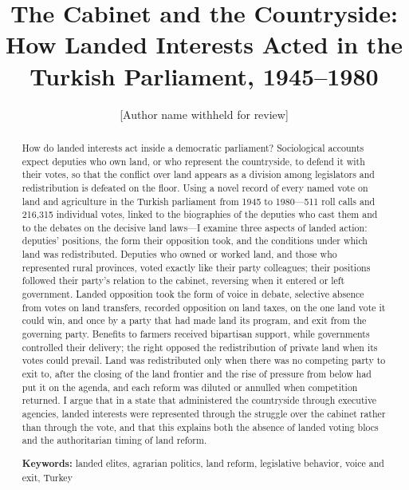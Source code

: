 \documentclass[12pt]{article}
\title{\textbf{The Cabinet and the Countryside:\\ How Landed Interests Acted in the Turkish Parliament, 1945--1980}}
\author{[Author name withheld for review]}
\date{}
\begin{document}
\maketitle
\thispagestyle{empty}

\begin{abstract}
\noindent How do landed interests act inside a democratic parliament? Sociological accounts expect deputies who own land, or who represent the countryside, to defend it with their votes, so that the conflict over land appears as a division among legislators and redistribution is defeated on the floor. Using a novel record of every named vote on land and agriculture in the Turkish parliament from 1945 to 1980---511 roll calls and 216,315 individual votes, linked to the biographies of the deputies who cast them and to the debates on the decisive land laws---I examine three aspects of landed action: deputies' positions, the form their opposition took, and the conditions under which land was redistributed. Deputies who owned or worked land, and those who represented rural provinces, voted exactly like their party colleagues; their positions followed their party's relation to the cabinet, reversing when it entered or left government. Landed opposition took the form of voice in debate, selective absence from votes on land transfers, recorded opposition on land taxes, on the one land vote it could win, and once by a party that had made land its program, and exit from the governing party. Benefits to farmers received bipartisan support, while governments controlled their delivery; the right opposed the redistribution of private land when its votes could prevail. Land was redistributed only when there was no competing party to exit to, after the closing of the land frontier and the rise of pressure from below had put it on the agenda, and each reform was diluted or annulled when competition returned. I argue that in a state that administered the countryside through executive agencies, landed interests were represented through the struggle over the cabinet rather than through the vote, and that this explains both the absence of landed voting blocs and the authoritarian timing of land reform.

\medskip
\noindent\textbf{Keywords:} landed elites, agrarian politics, land reform, legislative behavior, voice and exit, Turkey
\end{abstract}

\newpage
\doublespacing
\setcounter{page}{1}
\end{document}
